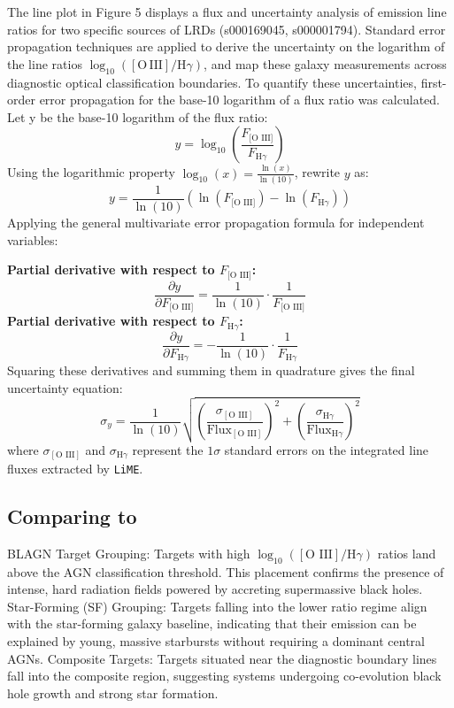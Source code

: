 \documentclass[twoside,twocolumn,12pt]{article}
\begin{document}
\fontsize{12}{14}\selectfont
The line plot in Figure 5 displays a flux and uncertainty analysis of emission line ratios for two specific sources of LRDs (s000169045, s000001794). Standard error propagation techniques are applied to derive the uncertainty on the logarithm of the line ratios $\log_{10}([\mathrm{O\,III}] / \mathrm{H}\gamma)$, and map these galaxy measurements across diagnostic optical classification boundaries. To quantify these uncertainties, first-order error propagation for the base-10 logarithm of a flux ratio was calculated. Let y be the base-10 logarithm of the flux ratio: 
$$y = \log_{10}\left(\frac{F_{\text{[O III]}}}{F_{\text{H}\gamma}}\right)$$
Using the logarithmic property $\log_{10}(x)=\frac{\ln(x)}{\ln(10)}$, rewrite $y$ as:
$$y = \frac{1}{\ln(10)} \left( \ln(F_{\text{[O III]}}) - \ln(F_{\text{H}\gamma}) \right)$$
Applying the general multivariate error propagation formula for independent variables:

\textbf{Partial derivative with respect to $F_{\text{[O III]}}$:}
$$\frac{\partial y}{\partial F_{\text{[O III]}}} = \frac{1}{\ln(10)} \cdot \frac{1}{F_{\text{[O III]}}}$$
\textbf{Partial derivative with respect to $F_{\text{H}\gamma}$:}
$$\frac{\partial y}{\partial F_{\text{H}\gamma}} = -\frac{1}{\ln(10)} \cdot \frac{1}{F_{\text{H}\gamma}}$$
Squaring these derivatives and summing them in quadrature gives the final uncertainty equation:
$$\sigma_y = \frac{1}{\ln(10)} \sqrt{ \left( \frac{\sigma_{[\text{O III}]}}{\text{Flux}_{[\text{O III}]}} \right)^2 + \left( \frac{\sigma_{\text{H}\gamma}}{\text{Flux}_{\text{H}\gamma}} \right)^2 }$$ where $\sigma_{[\text{O III}]}$ and $\sigma_{\text{H}\gamma}$ represent the $1\sigma$ standard errors on the integrated line fluxes extracted by \texttt{LiME}.

\subsection{Comparing to \citet{Backhaus2025}}
\fontsize{12}{14}\selectfont
    BLAGN Target Grouping: Targets with high $\log_{10}([\text{O III}]/\text{H}\gamma)$ ratios land above the \citet{Backhaus2025} AGN classification threshold. This placement confirms the presence of intense, hard radiation fields powered by accreting supermassive black holes. Star-Forming (SF) Grouping: Targets falling into the lower ratio regime align with the star-forming galaxy baseline, indicating that their emission can be explained by young, massive starbursts without requiring a dominant central AGNs. Composite Targets: Targets situated near the diagnostic boundary lines fall into the composite region, suggesting systems undergoing co-evolution black hole growth and strong star formation.
\end{document}
